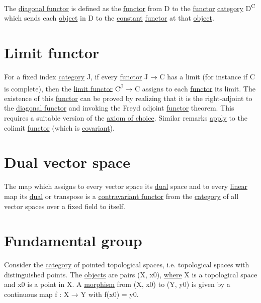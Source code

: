 \documentclass[a4paper,14pt,oneside]{book}
\begin{document}
The \hyperref[orgcbd943c]{diagonal functor} is defined as the \hyperref[org9608d9c]{functor} from D to the \hyperref[org9608d9c]{functor} \hyperref[org47ffd9b]{category} D\textsuperscript{C} which sends each \hyperref[org17d8013]{object} in D to the \hyperref[orgc2bd9ca]{constant} \hyperref[org9608d9c]{functor} at that \hyperref[org17d8013]{object}.

\chapter{\label{org4af08c5}Limit functor}
\label{sec:orgb1896a0}

For a fixed index \hyperref[org47ffd9b]{category} J, if every \hyperref[org9608d9c]{functor} J → C has a limit (for instance if C is complete), then the \hyperref[org4af08c5]{limit functor} C\textsuperscript{J} → C assigns to each \hyperref[org9608d9c]{functor} its limit. The existence of this \hyperref[org9608d9c]{functor} can be proved by realizing that it is the right-adjoint to the \hyperref[orgcbd943c]{diagonal functor} and invoking the Freyd adjoint \hyperref[org9608d9c]{functor} theorem. This requires a suitable version of the \hyperref[org0b3f82a]{axiom of choice}. Similar remarks \hyperref[org82a009d]{apply} to the colimit \hyperref[org9608d9c]{functor} (which is \hyperref[org703b1da]{covariant}). 

\chapter{\label{org11feef9}Dual vector space}
\label{sec:org30b4872}

The map which assigns to every vector space its \hyperref[org819c2c5]{dual} space and to every \hyperref[org39fc5c3]{linear} map its \hyperref[org819c2c5]{dual} or transpose is a \hyperref[orgf45f581]{contravariant functor} from the \hyperref[org47ffd9b]{category} of all vector spaces over a fixed field to itself.

\chapter{\label{org7f14b16}Fundamental group}
\label{sec:org894da2c}

Consider the \hyperref[org47ffd9b]{category} of pointed topological spaces, i.e. topological spaces with distinguished points. The \hyperref[orgca8021e]{objects} are pairs (X, x0), \hyperref[org3993fb7]{where} X is a topological space and x0 is a point in X. A \hyperref[orgbd49a37]{morphism} from (X, x0) to (Y, y0) is given by a continuous map f : X → Y with f(x0) = y0.
\end{document}
